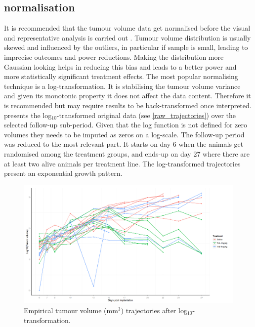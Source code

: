 \subsection{normalisation}
It is recommended that the tumour volume data get normalised before the visual and representative analysis is carried out \autocite{Heitjan:1993uw,Demidenko:2010gn}.
Tumour volume distribution is usually skewed and influenced by the outliers, in particular if sample is small, leading to imprecise outcomes and power reductions.
Making the distribution more Gaussian looking helps in reducing this bias and leads to a better power and more statistically significant treatment effects.
The most popular normalising technique is a log-transformation.
It is stabilising the tumour volume variance and given its monotonic property it does not affect the data content.
Therefore it is recommended but may require results to be back-transformed once interpreted.
 presents the log$_{10}$-transformed original data (see \cref{raw_trajectories}) over the selected follow-up sub-period.
Given that the log function is not defined for zero volumes they needs to be imputed as zeros on a log-scale.
The follow-up period was reduced to the most relevant part.
It starts on day 6 when the animals get randomised among the treatment groups, and ends-up on day 27 where there are at least two alive animals per treatment line.
The log-transformed trajectories present an exponential growth pattern.


\begin{figure}
	\centering
	\includegraphics[width=\textwidth]{xenograph/figures/raw_trajectories_log_reduced_follow-up.png}
	\caption{Empirical tumour volume (mm$^3$) trajectories after log$_{10}$-transformation.}
	\label{raw_trajectories_log_reduced_follow-up}
\end{figure}
